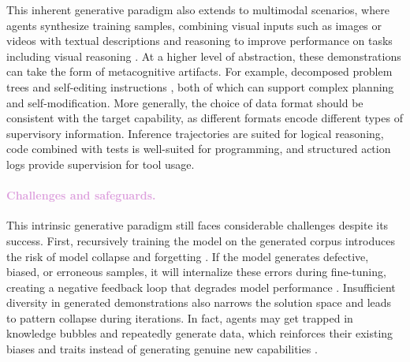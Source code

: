 This inherent generative paradigm also extends to multimodal scenarios, where agents synthesize training samples, combining visual inputs such as images or videos with textual descriptions and reasoning to improve performance on tasks including visual reasoning \citep{zhang2025will}. At a higher level of abstraction, these demonstrations can take the form of metacognitive artifacts. For example, decomposed problem trees \citep{simonds2025ladder} and self-editing instructions \citep{zweiger2025selfadapting}, both of which can support complex planning and self-modification. More generally, the choice of data format should be consistent with the target capability, as different formats encode different types of supervisory information. Inference trajectories are suited for logical reasoning, code combined with tests is well-suited for programming, and structured action logs provide supervision for tool usage.


\paragraph{\textcolor{Plum}{Challenges and safeguards.}}
This intrinsic generative paradigm still faces considerable challenges despite its success. First, recursively training the model on the generated corpus introduces the risk of model collapse and forgetting \citep{shumailov2024ai,shumailov2024curserecursiontraininggenerated}. If the model generates defective, biased, or erroneous samples, it will internalize these errors during fine-tuning, creating a negative feedback loop that degrades model performance \citep{zhao2024selfguidebettertaskspecificinstruction, wang2022self}. Insufficient diversity in generated demonstrations also narrows the solution space and leads to pattern collapse during iterations. In fact, agents may get trapped in knowledge bubbles and repeatedly generate data, which reinforces their existing biases and traits instead of generating genuine new capabilities \citep{wu2025progress, yuan2025superficial}.


